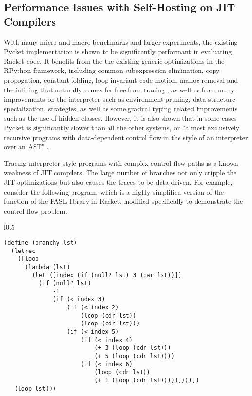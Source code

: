 \newpage

\subsection{Performance Issues with Self-Hosting on JIT Compilers}
\label{subsec:performance}

With many micro and macro benchmarks and larger experiments, the
existing Pycket implementation is shown to be significantly performant
in evaluating Racket code. It benefits from the the existing generic
optimizations in the RPython framework, including common subexpression
elimination, copy propogation, constant folding, loop invariant code
motion, malloc-removal and the inlining that naturally comes for free
from tracing \cite{loop-aware:12, hotpath:06, malloc-removal:11}, as
well as from many improvements on the interpreter such as environment
pruning, data structure specialization, strategies, as well as some
gradual typing related improvements such as the use of
hidden-classes. However, it is also shown that in some cases Pycket is
significantly slower than all the other systems, on "almost
exclusively recursive programs with data-dependent control flow in the
style of an interpreter over an AST" \cite{pycket15, pycket17}.

Tracing interpreter-style programs with complex control-flow paths is
a known weakness of JIT compilers. The large number of branches not
only cripple the JIT optimizations but also causes the traces to be
data driven. For example, consider the following program, which is a
highly simplified version of the  function of
the FASL library in Racket, modified specifically to demonstrate the
control-flow problem.

\begin{wrapfigure}[18]{l}{0.5\textwidth}
\small
\begin{lstlisting}[mathescape]
(define (branchy lst)
  (letrec
    ([loop
      (lambda (lst)
        (let ([index (if (null? lst) 3 (car lst))])
          (if (null? lst)
              -1
              (if (< index 3)
                  (if (< index 2)
                      (loop (cdr lst))
                      (loop (cdr lst)))
                  (if (< index 5)
                      (if (< index 4)
                          (+ 3 (loop (cdr lst)))
                          (+ 5 (loop (cdr lst))))
                      (if (< index 6)
                          (loop (cdr lst))
                          (+ 1 (loop (cdr lst)))))))))])
   (loop lst)))
\end{lstlisting}
\end{wrapfigure}

